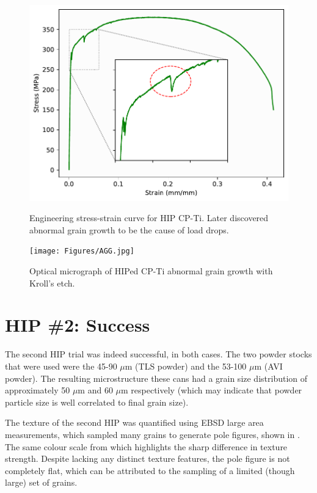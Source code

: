 \begin{figure}[h]
\centering
  \includegraphics[width=\textwidth]{Figures/HIPtensile.pdf}
  \caption{Engineering stress-strain curve for HIP CP-Ti. Later discovered abnormal grain growth to be the cause of load drops. \label{fig.tensileHIP}}
  \vspace{\baselineskip}
  \texttt{[image: Figures/AGG.jpg]}
  \caption{Optical micrograph of HIPed CP-Ti abnormal grain growth with Kroll's etch. \label{fig.AGG}}
\end{figure}


\section{HIP \#2: Success}

The second HIP trial was indeed successful, in both cases.
The two powder stocks that were used were the 45-90 $\mu$m (TLS powder) and the 53-100 $\mu$m (AVI powder). 
The resulting microstructure these cans had a grain size distribution of approximately 50 $\mu$m and 60 $\mu$m respectively (which may indicate that powder particle size is well correlated to final grain size).

The texture of the second HIP was quantified using EBSD large area measurements, which sampled many grains to generate pole figures, shown in .
The same colour scale from  which highlights the sharp difference in texture strength.
Despite lacking any distinct texture features, the pole figure is not completely flat, which can be attributed to the sampling of a limited (though large) set of grains.

